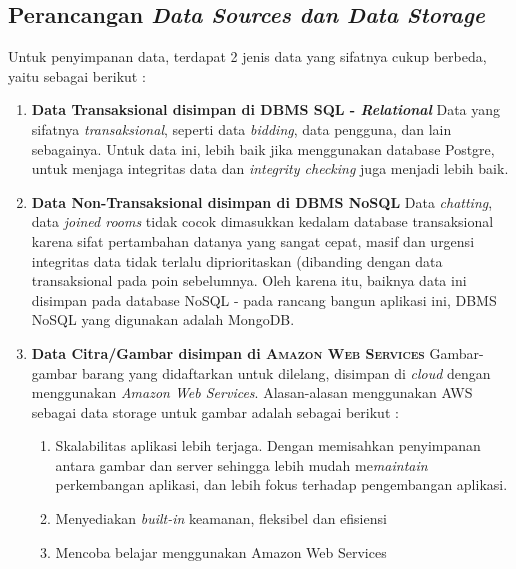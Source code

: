 
\subsection{Perancangan \textit{Data Sources dan Data Storage}}

	Untuk penyimpanan data, terdapat 2 jenis data yang sifatnya cukup berbeda, yaitu sebagai berikut :
    \\
    
    \begin{enumerate}
    \item \textbf{Data Transaksional disimpan di DBMS SQL - \textit{Relational}}
    \newline
    \indent Data yang sifatnya \textit{transaksional}, seperti data \textit{bidding}, data pengguna, dan lain sebagainya.
    Untuk data ini, lebih baik jika menggunakan database Postgre, untuk menjaga integritas data dan \textit{integrity checking} juga  menjadi lebih baik.
    \newline
    
    \item 
    \textbf{Data Non-Transaksional disimpan di DBMS NoSQL}
    \newline
    \indent Data \textit{chatting}, data \textit{joined rooms} tidak cocok dimasukkan kedalam database transaksional karena sifat pertambahan datanya yang sangat cepat, masif dan urgensi integritas data tidak terlalu diprioritaskan (dibanding dengan data transaksional pada poin sebelumnya.
    \newline
    \indent Oleh karena itu, baiknya data ini disimpan pada database NoSQL - pada rancang bangun aplikasi ini, DBMS NoSQL yang digunakan adalah MongoDB.
    \newline
    
    
    \item \textbf{Data Citra/Gambar disimpan di \textsc{Amazon Web Services}} \newline
    \indent Gambar-gambar barang yang didaftarkan untuk dilelang, disimpan di \textit{cloud} dengan menggunakan \textit{Amazon Web Services}. Alasan-alasan menggunakan AWS sebagai data storage untuk gambar adalah sebagai berikut :
        \begin{enumerate}[noitemsep,topsep=0pt]
        \item Skalabilitas aplikasi lebih terjaga. 
        \newline Dengan memisahkan penyimpanan antara gambar dan server sehingga lebih mudah me\textit{maintain} perkembangan aplikasi, dan lebih fokus terhadap pengembangan aplikasi.
        \item Menyediakan \textit{built-in} keamanan, fleksibel dan efisiensi \cite{wikipedia_amazon_2016}
        \item Mencoba belajar menggunakan Amazon Web Services
        \end{enumerate}
        

\end{enumerate}
